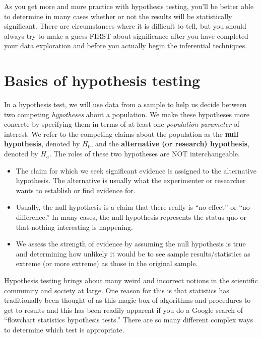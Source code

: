 \documentclass[12pt,]{krantz}
\providecommand{\tightlist}{%
  \setlength{\itemsep}{0pt}\setlength{\parskip}{0pt}}
\begin{document}
As you get more and more practice with hypothesis testing, you'll be
better able to determine in many cases whether or not the results will
be statistically significant. There are circumstances where it is
difficult to tell, but you should always try to make a guess FIRST about
significance after you have completed your data exploration and before
you actually begin the inferential techniques.

\section{Basics of hypothesis testing}\label{ht-basics}

In a hypothesis test, we will use data from a sample to help us decide
between two competing \emph{hypotheses} about a population. We make
these hypotheses more concrete by specifying them in terms of at least
one \emph{population parameter} of interest. We refer to the competing
claims about the population as the \textbf{null hypothesis}, denoted by
\(H_0\), and the \textbf{alternative (or research) hypothesis}, denoted
by \(H_a\). The roles of these two hypotheses are NOT interchangeable.

\begin{itemize}
\tightlist
\item
  The claim for which we seek significant evidence is assigned to the
  alternative hypothesis. The alternative is usually what the
  experimenter or researcher wants to establish or find evidence for.
\item
  Usually, the null hypothesis is a claim that there really is ``no
  effect'' or ``no difference.'' In many cases, the null hypothesis
  represents the status quo or that nothing interesting is happening.\\
\item
  We assess the strength of evidence by assuming the null hypothesis is
  true and determining how unlikely it would be to see sample
  results/statistics as extreme (or more extreme) as those in the
  original sample.
\end{itemize}

Hypothesis testing brings about many weird and incorrect notions in the
scientific community and society at large. One reason for this is that
statistics has traditionally been thought of as this magic box of
algorithms and procedures to get to results and this has been readily
apparent if you do a Google search of ``flowchart statistics hypothesis
tests.'' There are so many different complex ways to determine which
test is appropriate.
\end{document}
